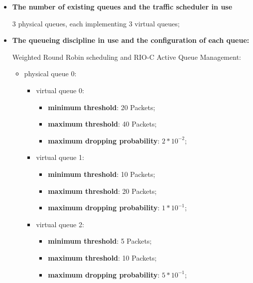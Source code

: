 \documentclass[conference,compsoc]{IEEEtran}
\begin{document}
\begin{itemize}
     \item \textbf{The number of existing queues and the traffic scheduler in use} \par 
     3 physical queues, each implementing 3 virtual queues;  
     

     \vspace{5mm}
     \item \textbf{The queueing discipline in use and the configuration of each queue:}\par
     Weighted Round Robin scheduling and RIO-C Active Queue Management: \par 
     \begin{itemize}
     \item physical queue 0:
     \begin{itemize}
     	\item virtual queue 0:
     	\begin{itemize}
     		\item \textbf{minimum threshold}: 20 Packets;
		     \item \textbf{maximum threshold}: 40 Packets;
		     \item \textbf{maximum dropping probability}: $2 * 10^{-2}$;
         \end{itemize}
    	 \item virtual queue 1:
   	  \begin{itemize}
     			\item \textbf{minimum threshold}: 10 Packets;
 			    \item \textbf{maximum threshold}: 20 Packets;
   			  \item \textbf{maximum dropping probability}: $1 * 10^{-1}$;
  	   \end{itemize}
	   
	   \item virtual queue 2:
   	  \begin{itemize}
     			\item \textbf{minimum threshold}: 5 Packets;
 			    \item \textbf{maximum threshold}: 10 Packets;
   			  \item \textbf{maximum dropping probability}: $5 * 10^{-1}$;
  	   \end{itemize}   
    \end{itemize}
    

\end{itemize}
\end{itemize}
\end{document}
